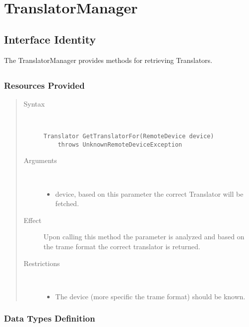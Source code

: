 \section{TranslatorManager}
\label{api:rm-translator-manager}

\subsection{Interface Identity}

\npar The TranslatorManager provides methods for retrieving Translators.

\subsection{}

\subsubsection{Resources Provided}

\begin{quote}
	\begin{description}
		\item[Syntax] \
		\begin{verbatim}
Translator GetTranslatorFor(RemoteDevice device) 
    throws UnknownRemoteDeviceException
		\end{verbatim}
		\item[Arguments] \
		\begin{itemize}
		  \item device, based on this parameter the correct Translator will be
		  fetched.
		\end{itemize}
		\item[Effect] Upon calling this method the parameter is analyzed and based on
		the trame format the correct translator is returned.
		\item[Restrictions] \
		\begin{itemize}
		  \item The device (more specific the trame format) should be
			known.
		\end{itemize}
	\end{description} 
\end{quote}

\subsubsection{Data Types Definition}

